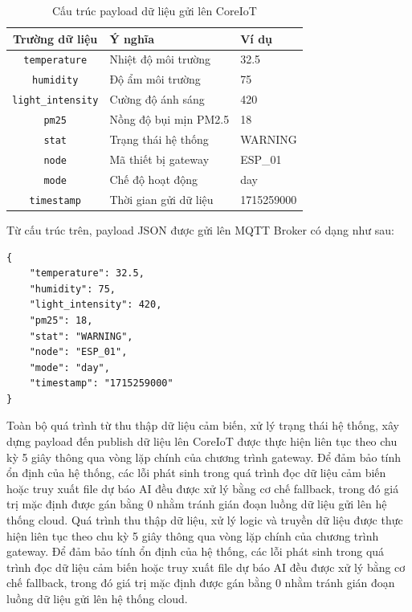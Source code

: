 \begin{table}[H]
\centering
\begin{tabular}{|c|l|l|}
\hline
\textbf{Trường dữ liệu} & \textbf{Ý nghĩa} & \textbf{Ví dụ} \\ \hline
\texttt{temperature} & Nhiệt độ môi trường & 32.5 \\ \hline
\texttt{humidity} & Độ ẩm môi trường & 75 \\ \hline
\texttt{light\_intensity} & Cường độ ánh sáng & 420 \\ \hline
\texttt{pm25} & Nồng độ bụi mịn PM2.5 & 18 \\ \hline
\texttt{stat} & Trạng thái hệ thống & WARNING \\ \hline
\texttt{node} & Mã thiết bị gateway & ESP\_01 \\ \hline
\texttt{mode} & Chế độ hoạt động & day \\ \hline
\texttt{timestamp} & Thời gian gửi dữ liệu & 1715259000 \\ \hline
\end{tabular}
\caption{Cấu trúc payload dữ liệu gửi lên CoreIoT}
\label{tab:api_payload}
\end{table}

Từ cấu trúc trên, payload JSON được gửi lên MQTT Broker có dạng như sau:

\begin{verbatim}
{
    "temperature": 32.5,
    "humidity": 75,
    "light_intensity": 420,
    "pm25": 18,
    "stat": "WARNING",
    "node": "ESP_01",
    "mode": "day",
    "timestamp": "1715259000"
}
\end{verbatim}

Toàn bộ quá trình từ thu thập dữ liệu cảm biến, xử lý trạng thái hệ thống, xây dựng payload đến publish dữ liệu lên CoreIoT được thực hiện liên tục theo chu kỳ 5 giây thông qua vòng lặp chính của chương trình gateway. Để đảm bảo tính ổn định của hệ thống, các lỗi phát sinh trong quá trình đọc dữ liệu cảm biến hoặc truy xuất file dự báo AI đều được xử lý bằng cơ chế fallback, trong đó giá trị mặc định được gán bằng 0 nhằm tránh gián đoạn luồng dữ liệu gửi lên hệ thống cloud.
Quá trình thu thập dữ liệu, xử lý logic và truyền dữ liệu được thực hiện liên tục theo chu kỳ 5 giây thông qua vòng lặp chính của chương trình gateway. Để đảm bảo tính ổn định của hệ thống, các lỗi phát sinh trong quá trình đọc dữ liệu cảm biến hoặc truy xuất file dự báo AI đều được xử lý bằng cơ chế fallback, trong đó giá trị mặc định được gán bằng 0 nhằm tránh gián đoạn luồng dữ liệu gửi lên hệ thống cloud.

